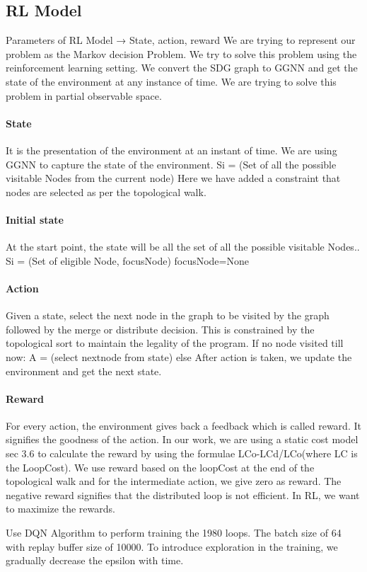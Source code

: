 \subsection{RL Model}
Parameters of RL Model → State, action, reward
We are trying to represent our problem as the Markov decision Problem. We try to solve this problem using the reinforcement learning setting. We convert the SDG graph to GGNN and get the state of the environment at any instance of time. We are trying to solve this problem in partial observable space. 

\paragraph{State} It is the presentation of the environment at an instant of time. We are using GGNN to capture the state of the environment.
Si = ({Set of all the possible visitable Nodes from the current node}) 
Here we have added a constraint that nodes are selected as per the topological walk.   

\paragraph{Initial state} At the start point, the state will be all the set of all the possible visitable Nodes..
Si = ({Set of eligible Node}, focusNode) focusNode=None 

\paragraph{Action} 
Given a state, select the next node in the graph to be visited by the graph followed by the merge or distribute decision. This is constrained by the topological sort to maintain the legality of the program.
If no node visited till now:
	A = (select nextnode from state)
else
After action is taken, we update the environment and get the next state.

\paragraph{Reward} For every action, the environment gives back a feedback which is called reward. It signifies the goodness of the action. In our work, we are using a static cost model sec 3.6 to calculate the reward by using the formulae LCo-LCd/LCo(where LC is the LoopCost). We use reward based on the loopCost at the end of the topological walk and for the intermediate action, we give zero as reward. The negative reward signifies that the distributed loop is not efficient. In RL, we want to maximize the rewards.

	Use DQN Algorithm to perform training the 1980 loops. The batch size of 64 with replay buffer size of 10000. To introduce  exploration in the training, we gradually decrease the epsilon with time. 
